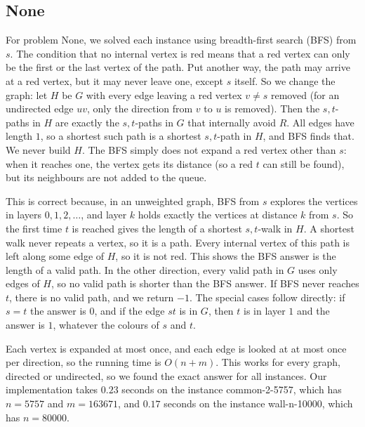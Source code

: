 \subsection{None}

For problem None, we solved each instance using breadth-first search (BFS) from $s$.
The condition that no internal vertex is red means that a red vertex can only be the
first or the last vertex of the path. Put another way, the path may arrive at a
red vertex, but it may never leave one, except $s$ itself. So we change the graph:
let $H$ be $G$ with every edge leaving a red vertex $v \neq s$ removed (for an
undirected edge $uv$, only the direction from $v$ to $u$ is removed). Then the
$s,t$-paths in $H$ are exactly the $s,t$-paths in $G$ that internally avoid $R$.
All edges have length $1$, so a shortest such path is a shortest $s,t$-path in
$H$, and BFS finds that. We never build $H$. The BFS simply does not expand a red
vertex other than $s$: when it reaches one, the vertex gets its distance (so a
red $t$ can still be found), but its neighbours are not added to the queue.

This is correct because, in an unweighted graph, BFS from $s$ explores the
vertices in layers $0, 1, 2, \dots$, and layer $k$ holds exactly the vertices at
distance $k$ from $s$. So the first time $t$ is reached gives the length of a
shortest $s,t$-walk in $H$. A shortest walk never repeats a vertex, so it is a
path. Every internal vertex of this path is left along some edge of $H$, so it is
not red. This shows the BFS answer is the length of a valid path. In the other
direction, every valid path in $G$ uses only edges of $H$, so no valid path is
shorter than the BFS answer. If BFS never reaches $t$, there is no valid path,
and we return $-1$. The special cases follow directly: if $s = t$ the answer is
$0$, and if the edge $st$ is in $G$, then $t$ is in layer $1$ and the answer is
$1$, whatever the colours of $s$ and $t$.

Each vertex is expanded at most once, and each edge is looked at at most once per
direction, so the running time is $O(n + m)$. This works for every graph, directed
or undirected, so we found the exact answer for all instances. Our implementation
takes $0.23$ seconds on the instance common-2-5757, which has $n = 5757$ and
$m = 163671$, and $0.17$ seconds on the instance wall-n-10000, which has
$n = 80000$.
